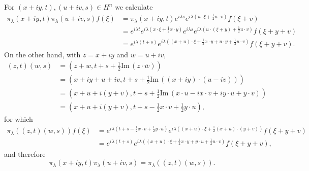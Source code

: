 \documentclass{article}
\def\Im{\ensuremath{\mathrm{Im}}\,}
\theoremstyle{definition}
\begin{document}
For $(x+iy,t),(u+iv,s) \in H^n$ we calculate
\begin{align*}
\pi_\lambda (x+iy,t) \pi_\lambda(u+iv,s) f(\xi)&=\pi_\lambda(x+iy,t) e^{i\lambda s} e^{i\lambda\left(u\cdot \xi+\frac{1}{2}u \cdot v\right)}
f(\xi+v)\\
&=e^{i\lambda t} e^{i\lambda\left(x\cdot \xi+\frac{1}{2}x\cdot y\right)}
e^{i\lambda s} e^{i\lambda\left(u\cdot (\xi+y)+\frac{1}{2}u \cdot v\right)} f(\xi+y+v)\\
&=e^{i\lambda(t+s)} e^{i\lambda\left((x+u)\cdot \xi + \frac{1}{2}x\cdot y+u\cdot y+\frac{1}{2}u\cdot v\right)}
f(\xi+y+v).
\end{align*}
On the other hand, with $z=x+iy$ and $w=u+iv$,
\begin{align*}
(z,t)(w,s)&=\left(z+w,t+s+\frac{1}{2} \Im(z \cdot \overline{w})\right)\\
&=\left(x+iy+u+iv,t+s+\frac{1}{2}\Im((x+iy)\cdot (u-iv))\right)\\
&=\left(x+u+i(y+v),t+s+\frac{1}{2}\Im(x\cdot u - ix\cdot v + iy \cdot u + y \cdot v)\right)\\
&=\left(x+u+i(y+v),t+s-\frac{1}{2}x\cdot v + \frac{1}{2} y\cdot u \right),
\end{align*}
for which
\begin{align*}
\pi_\lambda((z,t)(w,s))f(\xi)&=e^{i\lambda\left(t+s-\frac{1}{2}x\cdot v + \frac{1}{2} y\cdot u\right)}
e^{i\lambda\left((x+u)\cdot \xi+\frac{1}{2}(x+u)\cdot (y+v) \right)} f(\xi+y+v)\\
&=e^{i\lambda(t+s)} e^{i\lambda\left((x+u)\cdot \xi+\frac{1}{2}x\cdot y+y \cdot u
+\frac{1}{2}u\cdot v\right)} f(\xi+y+v),
\end{align*}
and therefore
\[
\pi_\lambda (x+iy,t) \pi_\lambda(u+iv,s)  = \pi_\lambda((z,t)(w,s)).
\]
\end{document}
